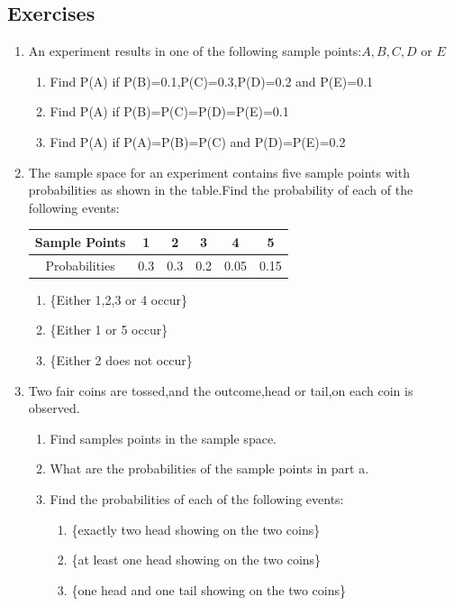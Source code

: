 




\subsection{Exercises}
\begin{enumerate}
\item An experiment results in one of the following sample points:$A,B,C,D$ or $E$

\begin{enumerate}
\item Find P(A) if P(B)=0.1,P(C)=0.3,P(D)=0.2 and P(E)=0.1
\item Find P(A) if P(B)=P(C)=P(D)=P(E)=0.1
\item Find P(A) if P(A)=P(B)=P(C) and P(D)=P(E)=0.2
\end{enumerate}
\item The sample space for an experiment contains five sample points with probabilities as shown in the table.Find the probability of each of the following events:
\begin{center}
\begin{tabular}{|c|c|c|c|c|c|}\hline
Sample Points&1&2&3&4&5\\ \hline
Probabilities&0.3&0.3&0.2&0.05&0.15
 \\ \hline
\end{tabular}
\end{center}
\begin{enumerate}
\item \{Either 1,2,3 or 4 occur\}
\item \{Either 1 or 5 occur\}
\item \{Either 2 does not occur\}
\end{enumerate}

\item Two fair coins are tossed,and the outcome,head or tail,on each coin is observed.
\begin{enumerate}
\item Find samples points in the sample space.
\item What are the probabilities of the sample points in part a.
\item Find the probabilities of each of the following events:
\begin{enumerate}
\item \{exactly two head showing on the two coins\}
\item \{at least one head showing on the two coins\}
\item \{one head and one tail showing on the two coins\}
\end{enumerate}
\end{enumerate}




\end{enumerate}
